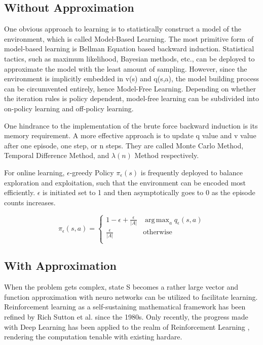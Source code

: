 \documentclass[journal]{IEEEtran}
\DeclareMathOperator*{\argmax}{arg\,max}  %
\begin{document}
\subsection{Without Approximation}
One obvious approach to learning is to statistically construct a model of the environment, which is called Model-Based Learning. The most primitive form of model-based learning is Bellman Equation based backward induction. Statistical tactics, such as maximum likelihood, Bayesian methods, etc., can be deployed to approximate the model with the least amount of sampling. However, since the environment is implicitly embedded in v(s) and q(s,a), the model building process can be circumvented entirely, hence Model-Free Learning. Depending on whether the iteration rules is policy dependent, model-free learning can be subdivided into on-policy learning and off-policy learning.

One hindrance to the implementation of the brute force backward induction is its memory requirement. A more effective approach is to update q value and v value after one episode, one step, or n steps. They are called Monte Carlo Method, Temporal Difference Method, and $\lambda(n)$ Method respectively.

For online learning, $\epsilon$-greedy Policy $\pi_{\epsilon}(s)$ is frequently deployed to balance exploration and exploitation, such that the environment can be encoded most efficiently. $\epsilon$ is initiated set to 1 and then asymptotically goes to 0 as the episode counts increases.

\begin{equation*}
    \pi_{\epsilon}(s,a) = \begin{cases}
        1-\epsilon+\frac{\epsilon}{|A|}& \displaystyle\argmax_{a} q_{\epsilon}(s,a)\\
        \frac{\epsilon}{|A|}& \text{otherwise}\\
           \end{cases}
\end{equation*}

\subsection{With Approximation}
When the problem gets complex, state S becomes a rather large vector and function approximation with neuro networks can be utilized to facilitate learning. Reinforcement learning as a self-sustaining mathematical framework has been refined by Rich Sutton et al. since the 1980s. Only recently, the progress made with Deep Learning has been applied to the realm of Reinforcement Learning \cite{Mnih2013PlayingAW}, rendering the computation tenable with existing hardare.
\end{document}
